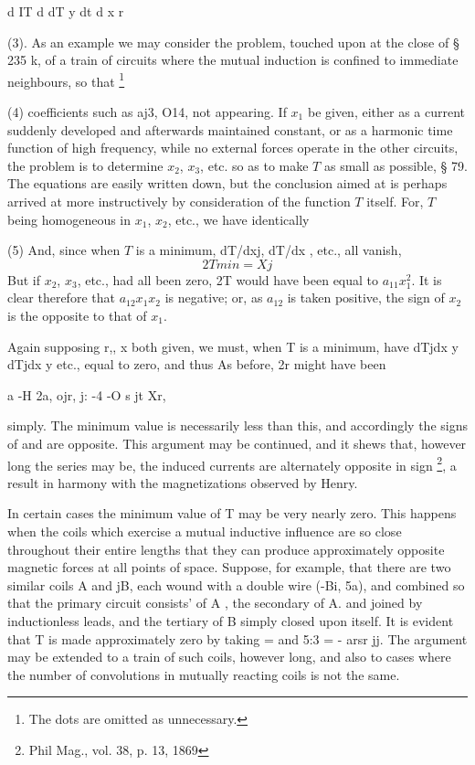 d IT d dT  y dt d x r

(3).  As an example we may consider the problem, touched upon at
the close of § 235 k, of a train of circuits where the mutual induction is
confined to immediate neighbours, so that
\footnote{The dots are omitted as unnecessary.}

(4) coefficients such as aj3, O14, not appearing.  If \(x_1\)
be given, either as a current suddenly developed and
afterwards maintained constant, or as a harmonic time function of high
frequency, while no external forces operate in the other circuits, the problem
is to determine
\(x_2\),
\(x_3\),
etc. so as to make \(T\) as small as possible, § 79. The
equations are easily written down, but the conclusion
aimed at is perhaps arrived at more instructively by consideration
of the function \(T\) itself. For, \(T\)
being homogeneous in
\(x_1\),
\(x_2\), etc.,
we have identically

(5) And, since when \(T\) is a minimum, dT/dxj, dT/dx , etc., all vanish,
\[ 2 T min = Xj\]
But if
\(x_2\), \(x_3\), etc., had all been zero, 2T would have been equal to
\( a_{11} x_1^2\). It is clear therefore that
\( a_{12} x_1 x_2\) is negative; or, as
\( a_{12} \) is taken positive, the sign
of \(x_2\) is the opposite to that of \(x_1\).

Again supposing r,, x both given, we must, when T is a minimum, have dTjdx y
dTjdx y etc., equal to zero, and thus As before, 2r might have been

a -H 2a, ojr, j:  -4 -O s jt Xr,

simply. The minimum value is necessarily less than this, and accordingly the
signs of and are opposite. This argument may be continued, and it shews that,
however long the series may be, the induced currents are alternately opposite
in sign \footnote{Phil Mag., vol. 38, p. 13, 1869}, a result in harmony with
the magnetizations observed by Henry.

In certain cases the minimum value of T may be very nearly zero. This happens
when the coils which exercise a mutual inductive influence are so close
throughout their entire lengths that they can produce approximately opposite
magnetic forces at all points of space. Suppose, for example, that there are
two similar coils A and jB, each wound with a double wire (-Bi, 5a), and
combined so that the primary circuit consists' of A , the secondary of A. and
joined by inductionless leads, and the tertiary of B simply closed upon itself.
It is evident that T is made approximately zero by taking = and 5:3 = - arsr jj.
The argument may be extended to a train of such coils, however long, and
also to cases where the number of convolutions in mutually reacting coils is
not the same.

